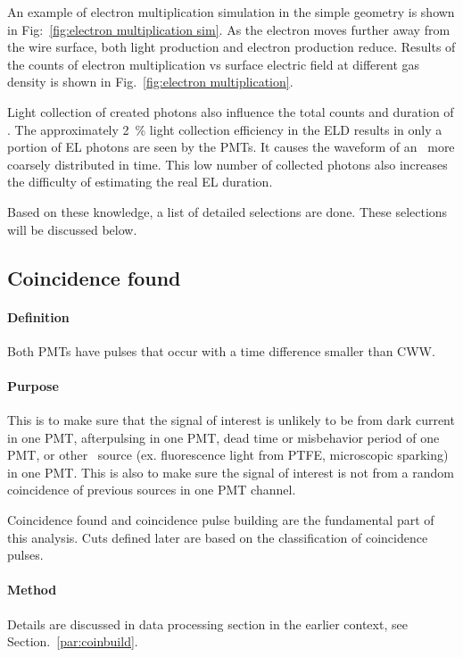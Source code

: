 An example of electron multiplication simulation in the simple geometry is shown in Fig:~\ref{fig:electron multiplication sim}. As the electron moves further away from the wire surface, both light production and electron production reduce. Results of the counts of electron multiplication vs surface electric field at different gas density is shown in Fig.~\ref{fig:electron multiplication}. 




Light collection of created photons also influence the total counts and duration of \eep . The approximately \SI{2}{\percent} light collection efficiency in the ELD results in only a portion of EL photons are seen by the PMTs. It causes the waveform of an \eep\ more coarsely distributed in time. This low number of collected photons also increases the difficulty of estimating the real EL duration.

Based on these knowledge, a list of detailed selections are done. These selections will be discussed below.   

\subsection{Coincidence found}

\paragraph{Definition}
Both PMTs have pulses that occur with a time difference smaller than CWW. 

\paragraph{Purpose}
This is to make sure that the signal of interest is unlikely to be from dark current in one PMT, afterpulsing in one PMT, dead time or misbehavior period of one PMT, or other \sphe\ source (ex. fluorescence light from PTFE, microscopic sparking) in one PMT. This is also to make sure the signal of interest is not from a random coincidence of previous sources in one PMT channel. 

Coincidence found and coincidence pulse building are the fundamental part of this analysis. Cuts defined later are based on the classification of coincidence pulses. 

\paragraph{Method}
Details are discussed in data processing section in the earlier context, see Section.~\ref{par:coinbuild}. 

